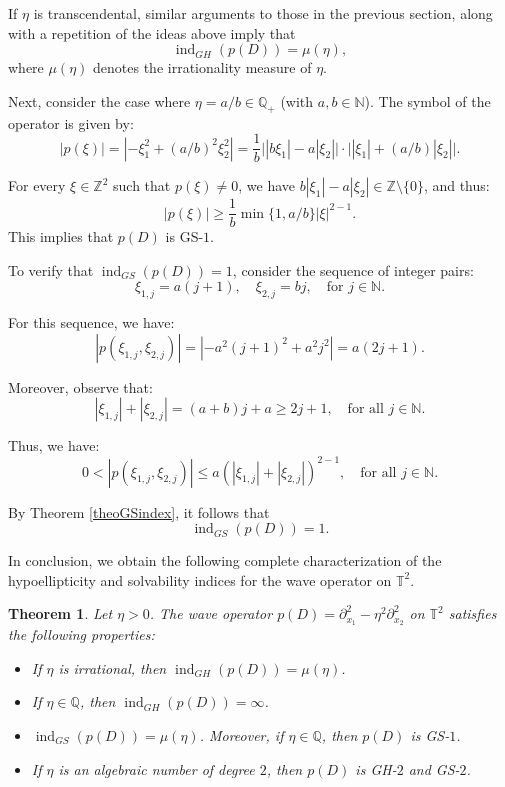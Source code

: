 \documentclass[11pt]{amsart}
\numberwithin{equation}{section}
\newtheorem{theorem}{Theorem}[section]
\theoremstyle{definition}
\begin{document}
	If $\eta$ is transcendental, similar arguments to those in the previous section, along with a repetition of the ideas above imply that
	\[
	\operatorname{ind}_{GH}(p(D)) = \mu(\eta),
	\]
	where $\mu(\eta)$ denotes the irrationality measure of $\eta$.

	Next, consider the case where $\eta = a/b \in \mathbb{Q}_+$ (with $a, b \in \mathbb{N}$). The symbol of the operator is given by:
	\[
	|p(\xi)| = |-\xi_1^2 + (a/b)^2 \xi_2^2| = \frac{1}{b} \big||b\xi_1| - a|\xi_2|\big| \cdot \big||\xi_1| + (a/b)|\xi_2|\big|.
	\]
	
	For every $\xi \in \mathbb{Z}^2$ such that $p(\xi) \neq 0$, we have $b|\xi_1| - a|\xi_2| \in \mathbb{Z} \setminus \{0\}$, and thus:
	\[
	|p(\xi)| \geq \frac{1}{b} \min\{1, a/b\} |\xi|^{2-1}.
	\]
	This implies that $p(D)$ is GS-$1$.
	
	To verify that $\operatorname{ind}_{GS}(p(D)) = 1$, consider the sequence of integer pairs:
	\[
	\xi_{1,j} = a(j+1), \quad \xi_{2,j} = bj, \quad \text{for } j \in \mathbb{N}.
	\]
	
	For this sequence, we have:
	\[
	|p(\xi_{1,j}, \xi_{2,j})| = |-a^2(j+1)^2 + a^2j^2| = a(2j+1).
	\]
	
	Moreover, observe that:
	\[
	|\xi_{1,j}| + |\xi_{2,j}| = (a+b)j + a \geq 2j+1, \quad \text{for all } j \in \mathbb{N}.
	\]
	
	Thus, we have:
	\[
	0 < |p(\xi_{1,j}, \xi_{2,j})| \leq a(|\xi_{1,j}| + |\xi_{2,j}|)^{2-1}, \quad \text{for all } j \in \mathbb{N}.
	\]
	
	By Theorem \ref{theoGSindex}, it follows that 
	\[\operatorname{ind}_{GS}(p(D)) = 1.\]
	
	In conclusion, we obtain the following complete characterization of the hypoellipticity and solvability indices  for the wave operator on $\mathbb{T}^2$.

	\begin{theorem}\label{thm-wave-n=2}
		Let $\eta > 0$. The wave operator $p(D) = \partial_{x_1}^2 - \eta^2 \partial_{x_2}^2$ on $\mathbb{T}^2$ satisfies the following properties:
		\begin{itemize}
			\item[{\it (i)}] If $\eta$ is irrational, then $\operatorname{ind}_{GH}(p(D)) = \mu(\eta)$.
			
			\item[{\it (ii)}] If $\eta \in \mathbb{Q}$, then $\operatorname{ind}_{GH}(p(D)) = \infty$.
			
			\item[{\it (iii)}] $\operatorname{ind}_{GS}(p(D)) = \mu(\eta)$. Moreover, if $\eta \in \mathbb{Q}$, then $p(D)$ is GS-$1$.
			
			\item[{\it (iv)}] If $\eta$ is an algebraic number of degree $2$, then $p(D)$ is GH-$2$ and GS-$2$.
		\end{itemize}
	\end{theorem}
	
\end{document}
